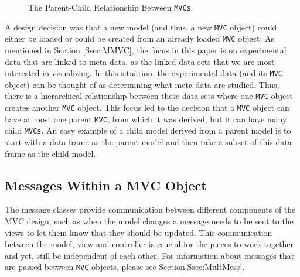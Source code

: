 \documentclass{article}[11pt]
\newcommand{\Robject}[1]{{\texttt{#1}}}
\begin{document}

\begin{figure}[ht]
  \begin{center}
    \caption{ The Parent-Child Relationship Between \Robject{MVCs}. }
    \label{Fig:Hier}
  \end{center}
\end{figure}

A design decision was that a new model (and thus, a new
\Robject{MVC} object) could either be loaded or could be created from an
already loaded \Robject{MVC} object.  As mentioned in Section
\ref{Ssec:MMVC}, the focus in this paper is on experimental data that are
linked to meta-data, as the linked data sets that we are most interested in
visualizing.  In this situation, the experimental data (and its
\Robject{MVC} object) can be thought of as determining what
meta-data are studied.  Thus, there is a hierarchical relationship between
these data sets where one \Robject{MVC} object creates another
\Robject{MVC} object.  This focus led to the decision that a
\Robject{MVC} object can have at most one parent
\Robject{MVC}, from which it was derived, but it can have many
child \Robject{MVCs}.  An easy example of a child model derived
from a parent model is to start with a data frame as the parent model and then
take a subset of this data frame as the child model. 

\subsection{Messages Within a MVC Object}\label{Ssec:OneMess}

The message classes provide communication between different
components of the MVC design, such as when the model changes a message needs
to be sent to the views to let them know that they should be updated.  This
communication between the model, view and controller is crucial for the pieces
to work together and yet, still be independent of each other.  For information
about messages that are passed between \Robject{MVC} objects, please see
Section\ref{Ssec:MultMess}. 
\end{document}
